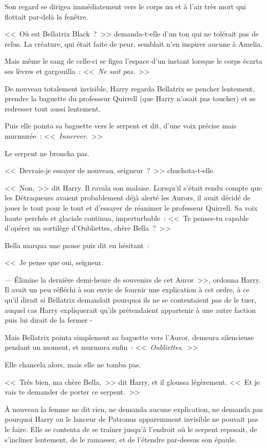 Son regard se dirigea immédiatement vers le corps nu et à l'air très mort qui flottait par-delà la fenêtre.

<<~Où est Bellatrix Black~?~>> demanda-t-elle d'un ton qui ne tolérait pas de refus. La créature, qui était faite de peur, semblait n'en inspirer aucune à Amelia.

Mais même le sang de celle-ci se figea l'espace d'un instant lorsque le corps écarta ses lèvres et gargouilla~: <<~\emph{Ne sait pas}.~>>

\later

De nouveau totalement invisible, Harry regarda Bellatrix se pencher lentement, prendre la baguette du professeur Quirrell (que Harry n'osait pas toucher) et se redresser tout aussi lentement.

Puis elle pointa sa baguette vers le serpent et dit, d'une voix précise mais murmurée~: <<~\emph{Innerver}.~>>

Le serpent ne broncha pas.

<<~Devrais-je essayer de nouveau, seigneur~?~>> chuchota-t-elle.

<<~Non,~>> dit Harry. Il ravala son malaise. Lorsqu'il s'était rendu compte que les Détraqueurs avaient probablement déjà alerté les Aurors, il avait décidé de jouer le tout pour le tout et d'essayer de réanimer le professeur Quirrell. Sa voix haute perchée et glaciale continua, imperturbable~: <<~Te penses-tu capable d'opérer un sortilège d'Oubliettes, chère Bella~?~>>

Bella marqua une pause puis dit en hésitant~:

<<~Je pense que oui, seigneur.

--- Élimine la dernière demi-heure de souvenirs de cet Auror~>>, ordonna Harry. Il avait un peu réfléchi à son envie de fournir une explication à cet ordre, à ce qu'il dirait si Bellatrix demandait pourquoi ils ne se contentaient pas de le tuer, auquel cas Harry expliquerait qu'ils prétendaient appartenir à une autre faction puis lui dirait de la fermer -

Mais Bellatrix pointa simplement sa baguette vers l'Auror, demeura silencieuse pendant un moment, et murmura enfin~: <<~\emph{Oubliettes}.~>>

Elle chancela alors, mais elle ne tomba pas.

<<~Très bien, ma chère Bella,~>> dit Harry, et il gloussa légèrement. <<~Et je vais te demander de porter ce serpent.~>>

À nouveau la femme ne dit rien, ne demanda aucune explication, ne demanda pas pourquoi Harry ou le lanceur de Patronus apparemment invisible ne pouvait pas le faire. Elle se contenta de se traîner jusqu'à l'endroit où le serpent reposait, de s'incliner lentement, de le ramasser, et de l'étendre par-dessus son épaule.

